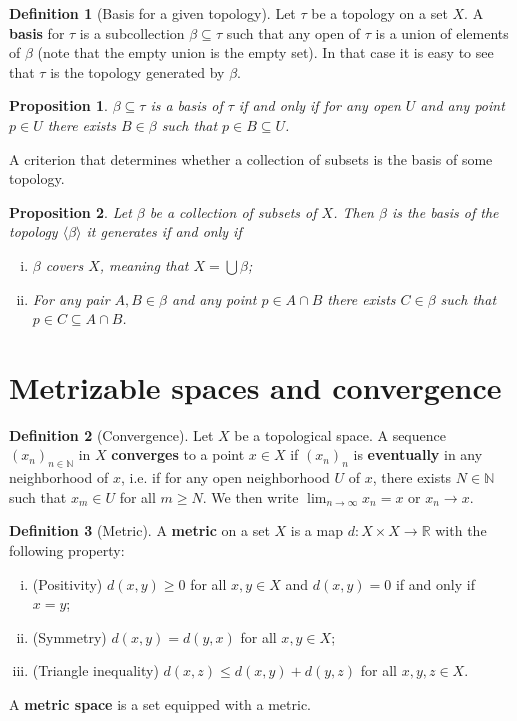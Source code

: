 \documentclass[a4paper,12pt,parskip=half*,chapterprefix=true,numbers=noendperiod]{scrreprt}
\newtheorem{proposition}{Proposition}[section]
\theoremstyle{definition}
\newtheorem{definition}{Definition}[section]
\theoremstyle{remark}
\begin{document}
\begin{definition}[Basis for a given topology]
	Let $\tau$ be a topology on a set $X$. A \textbf{basis} for $\tau$ is a subcollection $\beta\subseteq\tau$ such that any open of $\tau$ is a union of elements of $\beta$ (note that the empty union is the empty set). In that case it is easy to see that $\tau$ is the topology generated by $\beta$.
\end{definition}
\begin{proposition}
	$\beta\subseteq\tau$ is a basis of $\tau$ if and only if for any open $U$ and any point $p\in U$ there exists $B\in\beta$ such that $p\in B\subseteq U$.
\end{proposition}

A criterion that determines whether a collection of subsets is the basis of some topology.
\begin{proposition}
	Let $\beta$ be a collection of subsets of $X$. Then $\beta$ is the basis of the topology $\langle\beta\rangle$ it generates if and only if
	\begin{enumerate}[(i)]
		\item $\beta$ covers $X$, meaning that $X=\bigcup\beta$;
		\item For any pair $A,B\in\beta$ and any point $p\in A\cap B$ there exists $C\in\beta$ such that $p\in C\subseteq A\cap B$.
	\end{enumerate}
\end{proposition}

\section{Metrizable spaces and convergence}

\begin{definition}[Convergence]
	Let $X$ be a topological space. A sequence $(x_n)_{n\in\mathbb{N}}$ in $X$ \textbf{converges} to a point $x\in X$ if $(x_n)_n$ is \textbf{eventually} in any neighborhood of $x$, i.e. if for any open neighborhood $U$ of $x$, there exists $N\in\mathbb{N}$ such that $x_m\in U$ for all $m\geq N$. We then write $\lim_{n\to\infty}x_n=x$ or $x_n\to x$.
\end{definition}

\begin{definition}[Metric]
	A \textbf{metric} on a set $X$ is a map $d:X\times X\to\mathbb{R}$ with the following property:
	\begin{enumerate}[(i)]
		\item (Positivity) $d(x,y)\geq 0$ for all $x,y\in X$ and $d(x,y)=0$ if and only if $x=y$;
		\item (Symmetry) $d(x,y)=d(y,x)$ for all $x,y\in X$;
		\item (Triangle inequality) $d(x,z)\leq d(x,y)+d(y,z)$ for all $x,y,z\in X$.
	\end{enumerate}
	A \textbf{metric space} is a set equipped with a metric.
\end{definition}
\end{document}
